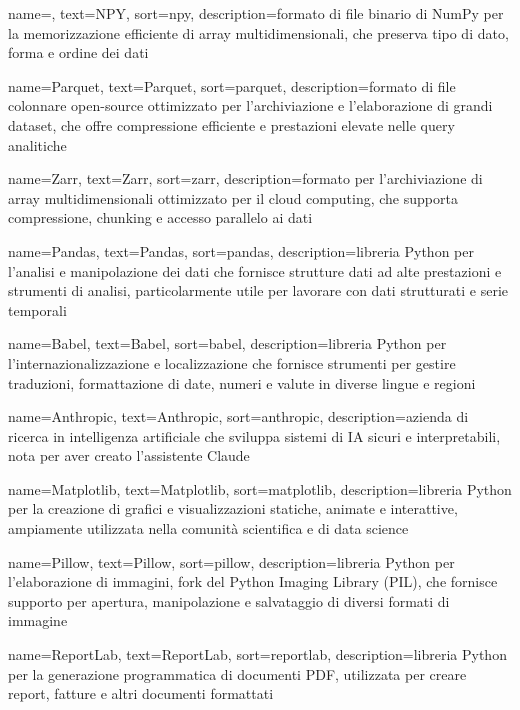  {
    name=,
    text=NPY,
    sort=npy,
    description={formato di file binario di NumPy per la memorizzazione efficiente di array multidimensionali, che preserva tipo di dato, forma e ordine dei dati}
}

 {
    name=Parquet,
    text=Parquet,
    sort=parquet,
    description={formato di file colonnare open-source ottimizzato per l'archiviazione e l'elaborazione di grandi dataset, che offre compressione efficiente e prestazioni elevate nelle query analitiche}
}

 {
    name=Zarr,
    text=Zarr,
    sort=zarr,
    description={formato per l'archiviazione di array multidimensionali ottimizzato per il cloud computing, che supporta compressione, chunking e accesso parallelo ai dati}
}

 {
    name=Pandas,
    text=Pandas,
    sort=pandas,
    description={libreria Python per l'analisi e manipolazione dei dati che fornisce strutture dati ad alte prestazioni e strumenti di analisi, particolarmente utile per lavorare con dati strutturati e serie temporali}
}

 {
    name=Babel,
        text=Babel,
        sort=babel,
        description={libreria Python per l'internazionalizzazione e localizzazione che fornisce strumenti per gestire traduzioni, formattazione di date, numeri e valute in diverse lingue e regioni}
}

 {
    name=Anthropic,
    text=Anthropic,
    sort=anthropic,
    description={azienda di ricerca in intelligenza artificiale che sviluppa sistemi di IA sicuri e interpretabili, nota per aver creato l'assistente Claude}
}

 {
    name=Matplotlib,
    text=Matplotlib,
    sort=matplotlib,
    description={libreria Python per la creazione di grafici e visualizzazioni statiche, animate e interattive, ampiamente utilizzata nella comunità scientifica e di data science}
}

 {
    name=Pillow,
    text=Pillow,
    sort=pillow,
    description={libreria Python per l'elaborazione di immagini, fork del Python Imaging Library (PIL), che fornisce supporto per apertura, manipolazione e salvataggio di diversi formati di immagine}
}

 {
    name=ReportLab,
    text=ReportLab,
    sort=reportlab,
    description={libreria Python per la generazione programmatica di documenti PDF, utilizzata per creare report, fatture e altri documenti formattati}
}

